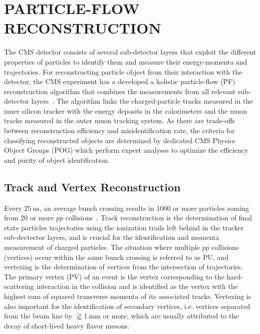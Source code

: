
\chapter{PARTICLE-FLOW RECONSTRUCTION}
\label{Particle-Flow_Reconstruction}
The CMS detector consists of several sub-detector layers that exploit the different properties of particles to identify them and measure their energy-momenta and trajectories.
For reconstructing particle object from their interaction with the detector, the CMS experiment has a developed a holistic particle-flow (PF) reconstruction algorithm that combines the measurements from all relevant sub-detector layers~\cite{Sirunyan:2270046}.
The algorithm links the charged-particle tracks measured in the inner silicon tracker with the energy deposits in the calorimeters and the muon tracks measured in the outer muon tracking system.
As there are trade-offs between reconstruction efficiency and misidentification rate, the criteria for classifying reconstructed objects are determined by dedicated CMS Physics Object Groups (POG) which perform expert analyses to optimize the efficiency and purity of object identification.

\section{Track and Vertex Reconstruction}
Every $\SI{25}{\ns}$, an average bunch crossing results in 1000 or more particles coming from 20 or more $pp$ collisions~\cite{Chatrchyan:1129810}.
Track reconstruction is the determination of final state particles trajectories using the ionization trails left behind in the tracker sub-dectector layers, and is crucial for the identification and momenta measurement of charged particles.
The situation where multiple $pp$ collisions (vertices) occur within the same bunch crossing is referred to as PU, and vertexing is the determination of vertices from the intersection of trajectories.
The primary vertex (PV) of an event is the vertex corresponding to the hard-scattering interaction in the collision and is identified as the vertex with the highest sum of squared transverse momenta of its associated tracks.
Vertexing is also important for the identification of secondary vertices, i.e. vertices separated from the beam line by $\gtrapprox \SI{1}{\mm}$ or more, which are usually attributed to the decay of short-lived heavy flavor mesons.

